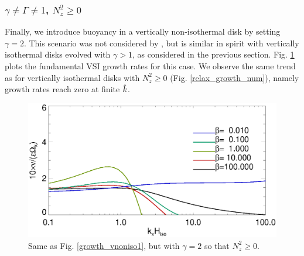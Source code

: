 \subsubsection{$\gamma\neq\Gamma \neq 1$, $N_z^2\geq0$}
Finally, we introduce buoyancy in a vertically non-isothermal disk by
setting $\gamma=2$. This scenario was not considered by  
\cite{nelson13}, but is similar in spirit with vertically isothermal 
disks evolved with $\gamma>1$, as considered in the previous section. 
Fig. \ref{growth_vnoniso2} plots the fundamental VSI growth rates for
this case. We observe the same trend as for vertically isothermal
disks with $N_z^2\geq 0$ (Fig. \ref{relax_growth_num}), namely growth
rates reach zero at finite $\hat{k}$. 

\begin{figure}
  \includegraphics[width=\linewidth,clip=true,trim=0cm 0cm 0cm
  0cm]{figures/growth_vnoniso2}
  \caption{Same as Fig. \ref{growth_vnoniso1}, but with $\gamma=2$ so that
    $N_z^2\geq0$. \label{growth_vnoniso2}}
\end{figure} 

 






















